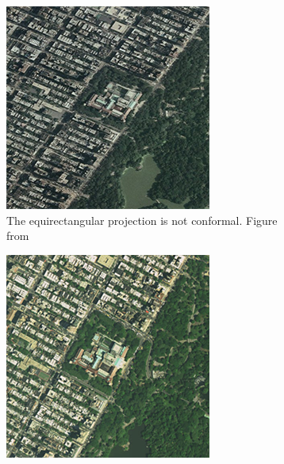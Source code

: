 \begin{figure}[htbp]
    \centering
    \begin{subfigure}[t]{0.3\textwidth}
        \includegraphics[width=\textwidth]{figures/central_park_equirectangular.png}
	\caption{The equirectangular projection is not conformal. Figure from \cite{imageryworld2d}}
    \end{subfigure}
    \qquad
    \begin{subfigure}[t]{0.3\textwidth}
        \includegraphics[width=\textwidth]{figures/central_park_mercator.png}

\end{subfigure}
\end{figure}
